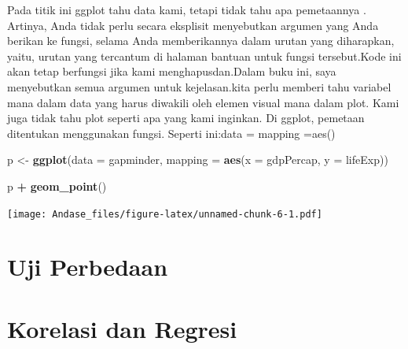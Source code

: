 \documentclass[
]{book}
\newenvironment{Shaded}{\begin{snugshade}}{\end{snugshade}}
\newcommand{\DataTypeTok}[1]{\textcolor[rgb]{0.13,0.29,0.53}{#1}}
\newcommand{\KeywordTok}[1]{\textcolor[rgb]{0.13,0.29,0.53}{\textbf{#1}}}
\newcommand{\NormalTok}[1]{#1}
\newcommand{\OperatorTok}[1]{\textcolor[rgb]{0.81,0.36,0.00}{\textbf{#1}}}
\newcommand{\StringTok}[1]{\textcolor[rgb]{0.31,0.60,0.02}{#1}}
\begin{document}
Pada titik ini ggplot tahu data kami, tetapi tidak tahu apa pemetaannya . Artinya, Anda tidak perlu secara eksplisit menyebutkan argumen yang Anda berikan ke fungsi, selama Anda memberikannya dalam urutan yang diharapkan, yaitu, urutan yang tercantum di halaman bantuan untuk fungsi tersebut.Kode ini akan tetap berfungsi jika kami menghapusdan.Dalam buku ini, saya menyebutkan semua argumen untuk kejelasan.kita perlu memberi tahu variabel mana dalam data yang harus diwakili oleh elemen visual mana dalam plot. Kami juga tidak tahu plot seperti apa yang kami inginkan. Di ggplot, pemetaan ditentukan menggunakan fungsi. Seperti ini:data = mapping =aes()

\begin{Shaded}
\begin{Highlighting}[]
\NormalTok{p \textless{}{-}}\StringTok{ }\KeywordTok{ggplot}\NormalTok{(}\DataTypeTok{data =}\NormalTok{ gapminder,}
            \DataTypeTok{mapping =} \KeywordTok{aes}\NormalTok{(}\DataTypeTok{x =}\NormalTok{ gdpPercap,}
                          \DataTypeTok{y =}\NormalTok{ lifeExp))}
\end{Highlighting}
\end{Shaded}

\begin{Shaded}
\begin{Highlighting}[]
\NormalTok{p }\OperatorTok{+}\StringTok{ }\KeywordTok{geom\_point}\NormalTok{()}
\end{Highlighting}
\end{Shaded}

\texttt{[image: Andase\_files/figure-latex/unnamed-chunk-6-1.pdf]}

\hypertarget{uji-perbedaan}{%
\chapter{Uji Perbedaan}\label{uji-perbedaan}}

\hypertarget{korelasi-dan-regresi}{%
\chapter{Korelasi dan Regresi}\label{korelasi-dan-regresi}}

  
\end{document}
